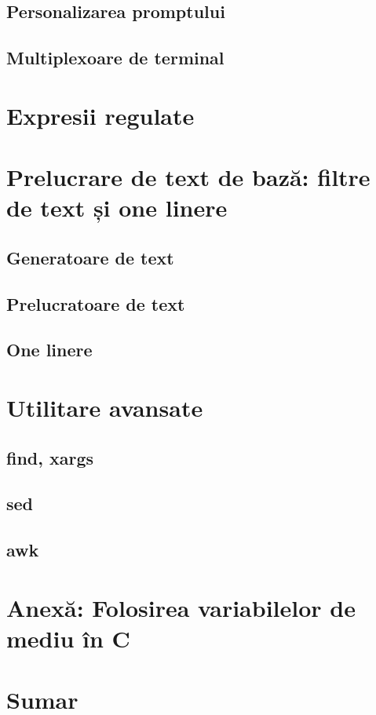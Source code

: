 \subsection{Personalizarea promptului}
\label{sec:cli-prompt}

\subsection{Multiplexoare de terminal}
\label{sec:cli-tmux}

\section{Expresii regulate}
\label{sec:cli-regex}

\section{Prelucrare de text de bază: filtre de text și one linere}
\label{sec:cli-basic-proc}

\subsection{Generatoare de text}
\label{sec:cli-text-gen}

\subsection{Prelucratoare de text}
\label{sec:cli-text-proc}

\subsection{One linere}
\label{sec:cli-one-liners}

\section{Utilitare avansate}
\label{sec:cli-advanced-utils}

\subsection{find, xargs}
\label{sec:cli-find-xargs}

\subsection{sed}
\label{sec:cli-sed}

\subsection{awk}
\label{sec:cli-awk}

\section{Anexă: Folosirea variabilelor de mediu în C}
\label{sec:cli-c-env-vars}

\section{Sumar}
\label{sec:cli-summary}
